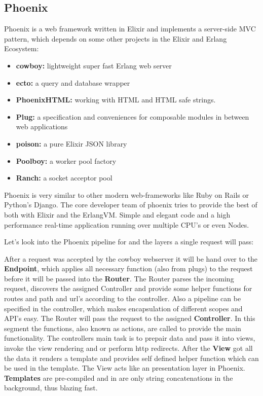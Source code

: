 \subsection{Phoenix}
Phoenix is a web framework written in Elixir and implements a server-side MVC pattern, which depends on some other projects in the Elixir and Erlang Ecosystem: 
\begin{itemize}
\item \textbf{cowboy:} lightweight super fast Erlang web server 
\item \textbf{ecto:} a query and database wrapper
\item \textbf{PhoenixHTML:} working with HTML and HTML safe strings.
\item \textbf{Plug:} a specification and conveniences for composable modules in between web applications
\item \textbf{poison:} a pure Elixir JSON library 
\item \textbf{Poolboy:} a worker pool factory 
\item \textbf{Ranch:} a socket acceptor pool
\end{itemize}

Phoenix is very similar to other modern web-frameworks like Ruby on Rails or Python's Django. The core developer team of phoenix tries to provide the best of both with Elixir and the ErlangVM. Simple and elegant code and a high performance real-time application running over multiple CPU's or even Nodes. 

Let's look into the Phoenix pipeline for and the layers a single request will pass: 

After a request was accepted by the cowboy webserver it will be hand over to the \textbf{Endpoint}, which applies all necessary function (also from plugs) to the request before it will be passed into the \textbf{Router}. The Router parses the incoming request, discovers the assigned Controller and provide some helper functions for routes and path and url's according to the controller. Also a pipeline can be specified in the controller, which makes encapsulation of different scopes and API's easy. The Router will pass the request to the assigned \textbf{Controller}. In this segment the functions, also known as actions, are called to provide the main functionality. The controllers main task is to prepair data and pass it into views, invoke the view rendering and or perform http redirects. After the \textbf{View} got all the data it renders a template and provides self defined helper function which can be used in the template. The View acts like an presentation layer in Phoenix. \textbf{Templates} are pre-compiled and in are only string concatenations in the background, thus blazing fast.

